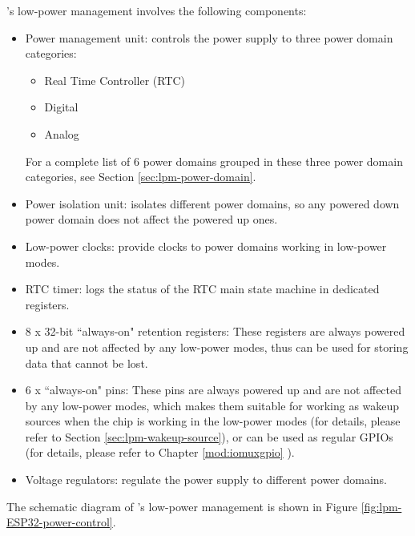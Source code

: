 \documentclass[main\_\_EN.tex]{subfiles}
\begin{document}
\chipname{}'s low-power management involves the following components:

\begin{itemize}
    \item Power management unit: controls the power supply to three power domain categories:
    \begin{itemize}
        \item Real Time Controller (RTC)
        \item Digital
        \item Analog
    \end{itemize}
    For a complete list of 6 power domains grouped in these three power domain categories, see Section \ref{sec:lpm-power-domain}.
    \item Power isolation unit: isolates different power domains, so any powered down power domain does not affect the powered up ones.
    \item Low-power clocks: provide clocks to power domains working in low-power modes.
    \item RTC timer: logs the status of the RTC main state machine in dedicated registers.
    \item 8 x 32-bit ``always-on" retention registers: These registers are always powered up and are not affected by any low-power modes, thus can be used for storing data that cannot be lost.
    \item 6 x ``always-on" pins: These pins are always powered up and are not affected by any low-power modes, which makes them suitable for working as wakeup sources when the chip is working in the low-power modes (for details, please refer to Section \ref{sec:lpm-wakeup-source}), or can be used as regular GPIOs (for details, please refer to Chapter \ref{mod:iomuxgpio} \textit{}).
    \item Voltage regulators: regulate the power supply to different power domains.
\end{itemize}

The schematic diagram of \chipname{}'s low-power management is shown in Figure \ref{fig:lpm-ESP32-power-control}.
\end{document}
